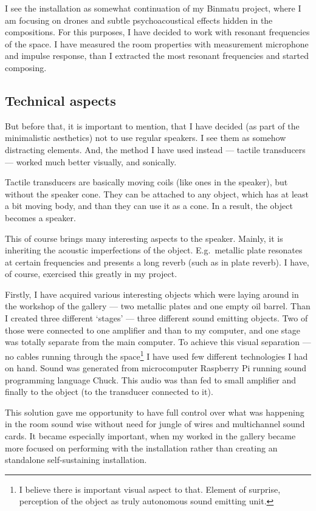 \documentclass[12pt,a4paper,oneside]{report}
\begin{document}
I see the installation as somewhat continuation of my Binmatu project, where I am focusing on drones and subtle psychoacoustical effects hidden in the compositions. For this purposes, I have decided to work with resonant frequencies of the space. I have measured the room properties with measurement microphone and impulse response, than I extracted the most resonant frequencies and started composing.

\subsection{Technical aspects}

But before that, it is important to mention, that I have decided (as part of the minimalistic aesthetics) not to use regular speakers. I see them as somehow distracting elements. And, the method I have used instead --- tactile transducers --- worked much better visually, and sonically.

Tactile transducers are basically moving coils (like ones in the speaker), but without the speaker cone. They can be attached to any object, which has at least a bit moving body, and than they can use it as a cone. In a result, the object becomes a speaker. 

This of course brings many interesting aspects to the speaker. Mainly, it is inheriting the acoustic imperfections of the object. E.g.\ metallic plate resonates at certain frequencies and presents a long reverb (such as in plate reverb). I have, of course, exercised this greatly in my project.

Firstly, I have acquired various interesting objects which were laying around in the workshop of the gallery --- two metallic plates and one empty oil barrel. Than I created three different `stages' --- three different sound emitting objects. Two of those were connected to one amplifier and than to my computer, and one stage was totally separate from the main computer. To achieve this visual separation --- no cables running through the space\footnote{I believe there is important visual aspect to that. Element of surprise, perception of the object as truly autonomous sound emitting unit.} I have used few different technologies I had on hand. Sound was generated from microcomputer Raspberry Pi running sound programming language Chuck. This audio was than fed to small amplifier and finally to the object (to the transducer connected to it).

This solution gave me opportunity to have full control over what was happening in the room sound wise without need for jungle of wires and multichannel sound cards. It became especially important, when my worked in the gallery became more focused on performing with the installation rather than creating an standalone self-sustaining installation.
\end{document}
